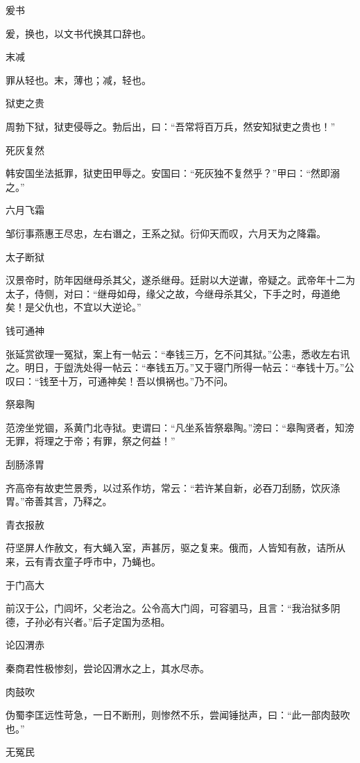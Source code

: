 \documentclass[a4paper,12pt,UTF8,twoside]{ctexbook}
\begin{document}
    爰书
    
    爰，换也，以文书代换其口辞也。
    
    末减
    
    罪从轻也。末，薄也；减，轻也。
    
    狱吏之贵
    
    周勃下狱，狱吏侵辱之。勃后出，曰：“吾常将百万兵，然安知狱吏之贵也！”
    
    死灰复然
    
    韩安国坐法抵罪，狱吏田甲辱之。安国曰：“死灰独不复然乎？”甲曰：“然即溺之。”
    
    六月飞霜
    
    邹衍事燕惠王尽忠，左右谮之，王系之狱。衍仰天而叹，六月天为之降霜。
    
    太子断狱
    
    汉景帝时，防年因继母杀其父，遂杀继母。廷尉以大逆谳，帝疑之。武帝年十二为太子，侍侧，对曰：“继母如母，缘父之故，今继母杀其父，下手之时，母道绝矣！是父仇也，不宜以大逆论。”
    
    钱可通神
    
    张延赏欲理一冤狱，案上有一帖云：“奉钱三万，乞不问其狱。”公恚，悉收左右讯之。明日，于盥洗处得一帖云：“奉钱五万。”又于寝门所得一帖云：“奉钱十万。”公叹曰：“钱至十万，可通神矣！吾以惧祸也。”乃不问。
    
    祭皋陶
    
    范滂坐党锢，系黄门北寺狱。吏谓曰：“凡坐系皆祭皋陶。”滂曰：“皋陶贤者，知滂无罪，将理之于帝；有罪，祭之何益！”
    
    刮肠涤胃
    
    齐高帝有故吏竺景秀，以过系作坊，常云：“若许某自新，必吞刀刮肠，饮灰涤胃。”帝善其言，乃释之。
    
    青衣报赦
    
    苻坚屏人作赦文，有大蝇入室，声甚厉，驱之复来。俄而，人皆知有赦，诘所从来，云有青衣童子呼市中，乃蝇也。
    
    于门高大
    
    前汉于公，门闾坏，父老治之。公令高大门闾，可容驷马，且言：“我治狱多阴德，子孙必有兴者。”后子定国为丞相。
    
    论囚渭赤
    
    秦商君性极惨刻，尝论囚渭水之上，其水尽赤。
    
    肉鼓吹
    
    伪蜀李匡远性苛急，一日不断刑，则惨然不乐，尝闻锤挞声，曰：“此一部肉鼓吹也。”
    
    无冤民
    
\end{document}
